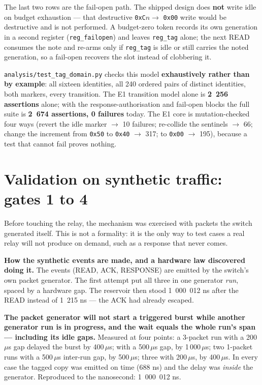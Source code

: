 \documentclass[10pt,a4paper,oneside]{article}
\newenvironment{keybox}{\begin{snugshade}\noindent\ignorespaces}{\end{snugshade}}
\newcommand{\num}[1]{\mbox{#1}}
\newcommand{\code}[1]{\texttt{\small #1}}
\begin{document}
The last two rows are the fail-open path. The shipped design does
\textbf{not} write idle on budget exhaustion --- that destructive \code{0xC}$n \to$
\code{0x00} write would be destructive and is not performed. A budget-zero token records its own generation
in a second register (\code{reg\_failopen}) and leaves \code{reg\_tag} alone; the next READ
consumes the note and re-arms only if \code{reg\_tag} is idle or still carries the noted
generation, so a fail-open recovers the slot instead of clobbering it.

\code{analysis/test\_tag\_domain.py} checks this model \textbf{exhaustively rather than by
example}: all sixteen identities, all 240 ordered pairs of distinct identities, both
markers, every transition. The E1 transition model alone is \textbf{\num{2 256} assertions}
alone; with the response-authorisation and fail-open blocks the full suite is \textbf{\num{2 674}
assertions, 0 failures} today. The E1 core is mutation-checked four ways (revert the idle
marker $\to$ 10 failures; re-collide the sentinels $\to$ 66; change the increment from
\code{0x50} to \code{0x40} $\to$ 317; to \code{0x00} $\to$ 195), because a test that cannot
fail proves nothing.

\section{Validation on synthetic traffic: gates 1 to 4}
\label{sec:gates}

Before touching the relay, the mechanism was exercised with packets the switch generated
itself. This is not a formality: it is the only way to test cases a real relay will not
produce on demand, such as a response that never comes.

\textbf{How the synthetic events are made, and a hardware law discovered doing it.} The
events (READ, ACK, RESPONSE) are emitted by the switch's own packet generator. The first
attempt put all three in one generator \emph{run}, spaced by a hardware gap. The reservoir
then stood \num{1 000 012} ns after the READ instead of \num{1 215} ns --- the ACK had
already escaped.

\begin{keybox}
\textbf{The packet generator will not start a triggered burst while another generator run is
in progress, and the wait equals the whole run's span --- including its idle gaps.}
Measured at four points: a 3-packet run with a 200\,$\mu$s gap delayed the burst by
400\,$\mu$s; with a 500\,$\mu$s gap, by 1\,000\,$\mu$s; two 1-packet runs with a
500\,$\mu$s inter-run gap, by 500\,$\mu$s; three with 200\,$\mu$s, by 400\,$\mu$s. In every
case the tagged copy was emitted on time (688 ns) and the delay was \emph{inside} the
generator. Reproduced to the nanosecond: \num{1 000 012} ns.
\end{keybox}
\end{document}
